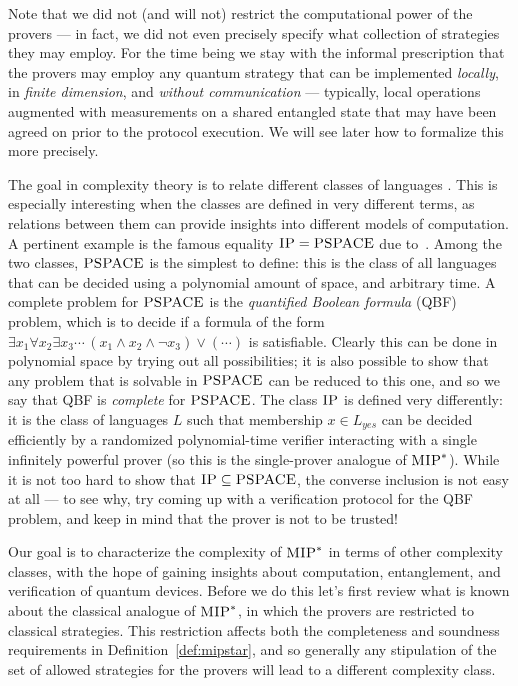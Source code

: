 Note that we did not (and will not) restrict the computational power of the provers --- in fact, we did not even precisely specify what collection of strategies they may employ. For the time being we stay with the informal prescription that the provers may employ any quantum strategy that can be implemented \emph{locally}, in \emph{finite dimension}, and \emph{without communication} --- typically, local operations augmented with measurements on a shared entangled state that may have been agreed on prior to the protocol execution. We will see later how to formalize this more precisely. 

\medskip

The goal in complexity theory is to relate different classes of languages . This is especially interesting when the classes are defined in very different terms, as relations between them can provide insights into different models of computation. A pertinent example is the famous equality $\textsc{IP} = \textsc{PSPACE}$ due to~\cite{lund1992algebraic,shamir1992ip}. Among the two classes, $\textsc{PSPACE}$ is the simplest to define: this is the class of all languages that can be decided using a polynomial amount of space, and arbitrary time. A complete problem for $\textsc{PSPACE}$ is the \emph{quantified Boolean formula} (QBF) problem, which is to decide if a formula of the form $\exists x_1 \forall x_2 \exists x_3\cdots  \, (x_1 \wedge x_2 \wedge \neg x_3) \vee (\cdots)$ is satisfiable. Clearly this can be done in polynomial space by trying out all possibilities; it is also possible to show that any problem that is solvable in $\textsc{PSPACE}$ can be reduced to this one, and so we say that QBF is \emph{complete} for $\textsc{PSPACE}$. The class $\textsc{IP}$ is defined very differently: it is the class of languages $L$ such that membership $x\in L_{yes}$ can be decided efficiently by a randomized polynomial-time verifier interacting with a single infinitely powerful prover (so this is the single-prover analogue of $\textsc{MIP}^*$).  While it is not too hard to show that $\textsc{IP} \subseteq \textsc{PSPACE}$, the converse inclusion is not easy at all --- to see why, try coming up with a verification protocol for the QBF problem, and keep in mind that the prover is not to be trusted!

Our goal is to characterize the complexity of $\textsc{MIP}^*$ in terms of other complexity classes, with the hope of gaining insights about computation, entanglement, and verification of quantum devices. Before we do this let's first review what is known about the classical analogue of $\textsc{MIP}^*$, in which the provers are restricted to classical strategies.  This restriction affects both the completeness and soundness requirements in Definition~\ref{def:mipstar}, and so generally any stipulation of the set of allowed strategies for the provers will lead to a different complexity class. 


